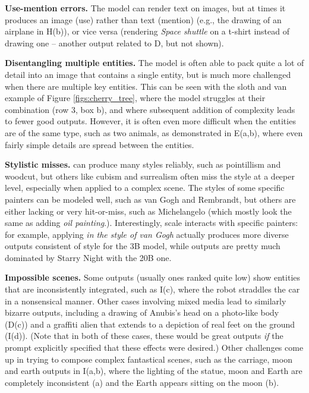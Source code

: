 \textbf{Use-mention errors.} The model can render text on images, but at times it produces an image (use) rather than text (mention) (e.g., the drawing of an airplane in H(b)), or vice versa (rendering \textit{Space shuttle} on a t-shirt instead of drawing one -- another output related to D, but not shown).

\textbf{Disentangling multiple entities.} The model is often able to pack quite a lot of detail into an image that contains a single entity, but is much more challenged when there are multiple key entities. This can be seen with the sloth and van example of  Figure \ref{figs:cherry_tree}, where the model struggles at their combination (row 3, box b), and where subsequent addition of complexity leads to fewer good outputs. However, it is often even more difficult when the entities are of the same type, such as two animals, as demonstrated in E(a,b), where even fairly simple details are spread between the entities.

\textbf{Stylistic misses.} \bdraw can produce many styles reliably, such as pointillism and woodcut, but others like cubism and surrealism often miss the style at a deeper level, especially when applied to a complex scene. The styles of some specific painters can be modeled well, such as van Gogh and Rembrandt, but others are either lacking or very hit-or-miss, such as Michelangelo (which mostly look the same as adding \textit{oil painting}.). Interestingly, scale interacts with specific painters: for example, applying \textit{in the style of van Gogh} actually produces more diverse outputs consistent of style for the 3B model, while outputs are pretty much dominated by Starry Night with the 20B one.

\textbf{Impossible scenes.} Some outputs (usually ones ranked quite low) show entities that are inconsistently integrated, such as I(c), where the robot straddles the car in a nonsensical manner. Other cases involving mixed media lead to similarly bizarre outputs, including a drawing of Anubis's head on a photo-like body (D(c))  and a graffiti alien that extends to a depiction of real feet on the ground (I(d)). (Note that in both of these cases, these would be great outputs \textit{if} the prompt explicitly specified that these effects were desired.) Other challenges come up in trying to compose complex fantastical scenes, such as the carriage, moon and earth outputs in I(a,b), where the lighting of the statue, moon and Earth are completely inconsistent (a) and the Earth appears sitting on the moon (b).

